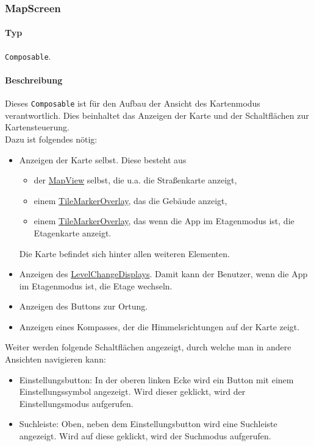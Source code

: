 \subsubsection{MapScreen}\label{App_Map_View_MapScreen}
\paragraph*{Typ}
\texttt{Composable}.
\paragraph*{Beschreibung}
Dieses \texttt{Composable} ist für den Aufbau der Ansicht des Kartenmodus verantwortlich.
Dies beinhaltet das Anzeigen der Karte und der Schaltflächen zur Kartensteuerung.\\
Dazu ist folgendes nötig:
\begin{itemize}
    \item Anzeigen der Karte selbst. Diese besteht aus
        \begin{itemize}
            \item der \href{https://osmdroid.github.io/osmdroid/javadocAll/org/osmdroid/views/MapView.html}
            {MapView} selbst, die u.a. die Straßenkarte anzeigt,
            \item einem \hyperref[App_Map_View_TileMarkerOverlay]{TileMarkerOverlay}, das die Gebäude anzeigt,
            \item einem \hyperref[App_Map_View_TileMarkerOverlay]{TileMarkerOverlay}, das wenn die App im Etagenmodus ist, die Etagenkarte anzeigt.
        \end{itemize}
        Die Karte befindet sich hinter allen weiteren Elementen.
    \item Anzeigen des \hyperref[App_Map_View_LevelChangeDisplay]{LevelChangeDisplays}. Damit kann der Benutzer, wenn die App im Etagenmodus 
    ist, die Etage wechseln.
    \item Anzeigen des Buttons zur Ortung.
    \item Anzeigen eines Kompasses, der die Himmelsrichtungen auf der Karte zeigt.
\end{itemize}
Weiter werden folgende Schaltflächen angezeigt, durch welche man in andere Ansichten navigieren kann:
\begin{itemize}
    \item Einstellungsbutton: In der oberen linken Ecke wird ein Button mit einem Einstellungssymbol angezeigt. 
    Wird dieser geklickt, wird der Einstellungsmodus aufgerufen.
    \item Suchleiste: Oben, neben dem Einstellungsbutton wird eine Suchleiste angezeigt. 
    Wird auf diese geklickt, wird der Suchmodus aufgerufen.
\end{itemize}
